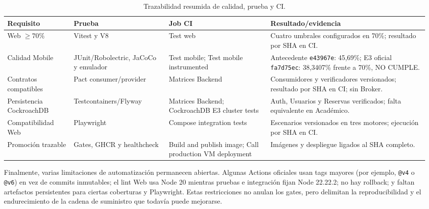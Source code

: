 \begin{table}[ht]
  \centering
  \small
  \caption{Trazabilidad resumida de calidad, prueba y CI.}
  \label{tab:trazabilidad-pruebas}
  \begin{tabular}{|p{3.1cm}|p{3.1cm}|p{3.2cm}|p{4.0cm}|}
    \hline
    \textbf{Requisito} & \textbf{Prueba} & \textbf{Job CI} & \textbf{Resultado/evidencia} \\
    \hline
    Web $\geq 70\%$ & Vitest y V8 & Test web & Cuatro umbrales configurados en 70\%; resultado por SHA en CI. \\
    \hline
    Calidad Mobile & JUnit/Robolectric, JaCoCo y emulador & Test mobile; Test mobile instrumented & Antecedente \texttt{e43967e}: 45,69\%; E3 oficial \texttt{fa7d75ec}: 38,3407\% frente a 70\%, NO CUMPLE. \\
    \hline
    Contratos compatibles & Pact consumer/provider & Matrices Backend & Consumidores y verificadores versionados; resultado por SHA en CI; sin Broker. \\
    \hline
    Persistencia CockroachDB & Testcontainers/Flyway & Matrices Backend; CockroachDB E3 cluster tests & Auth, Usuarios y Reservas verificados; falta equivalente en Académico. \\
    \hline
    Compatibilidad Web & Playwright & Compose integration tests & Escenarios versionados en tres motores; ejecución por SHA en CI. \\
    \hline
    Promoción trazable & Gates, GHCR y healthcheck & Build and publish image; Call production VM deployment & Imágenes y despliegue ligados al SHA completo. \\
    \hline
  \end{tabular}
\end{table}

Finalmente, varias limitaciones de automatización permanecen abiertas. Algunas
Actions oficiales usan tags mayores (por ejemplo, \texttt{@v4} o \texttt{@v6})
en vez de commits inmutables; el lint Web usa Node 20 mientras pruebas e
integración fijan Node 22.22.2; no hay rollback; y faltan artefactos persistentes
para ciertas coberturas y Playwright. Estas restricciones no anulan los gates,
pero delimitan la reproducibilidad y el endurecimiento de la cadena de
suministro que todavía puede mejorarse.
